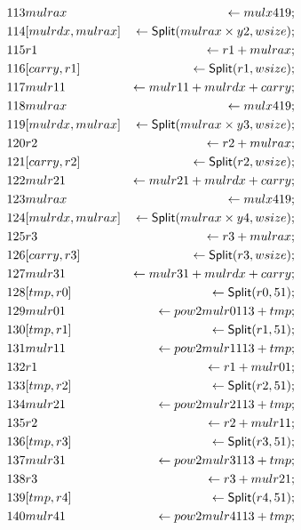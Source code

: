 \begin{align*}
113 & mulrax & \leftarrow mulx419; \\
114 & \concat{mulrdx}{mulrax} & \leftarrow \dslcode{Split}(mulrax \times y2, wsize); \\
115 & r1 & \leftarrow r1 + mulrax; \\
116 & \concat{carry}{r1} & \leftarrow \dslcode{Split}(r1, wsize); \\
117 & mulr11 & \leftarrow mulr11 + mulrdx + carry; \\
118 & mulrax & \leftarrow mulx419; \\
119 & \concat{mulrdx}{mulrax} & \leftarrow \dslcode{Split}(mulrax \times y3, wsize); \\
120 & r2 & \leftarrow r2 + mulrax; \\
121 & \concat{carry}{r2} & \leftarrow \dslcode{Split}(r2, wsize); \\
122 & mulr21 & \leftarrow mulr21 + mulrdx + carry; \\
123 & mulrax & \leftarrow mulx419; \\
124 & \concat{mulrdx}{mulrax} & \leftarrow \dslcode{Split}(mulrax \times y4, wsize); \\
125 & r3 & \leftarrow r3 + mulrax; \\
126 & \concat{carry}{r3} & \leftarrow \dslcode{Split}(r3, wsize); \\
127 & mulr31 & \leftarrow mulr31 + mulrdx + carry; \\
128 & \concat{tmp}{r0} & \leftarrow \dslcode{Split}(r0, 51); \\
129 & mulr01 & \leftarrow pow2 mulr01 13 + tmp; \\
130 & \concat{tmp}{r1} & \leftarrow \dslcode{Split}(r1, 51); \\
131 & mulr11 & \leftarrow pow2 mulr11 13 + tmp; \\
132 & r1 & \leftarrow r1 + mulr01; \\
133 & \concat{tmp}{r2} & \leftarrow \dslcode{Split}(r2, 51); \\
134 & mulr21 & \leftarrow pow2 mulr21 13 + tmp; \\
135 & r2 & \leftarrow r2 + mulr11; \\
136 & \concat{tmp}{r3} & \leftarrow \dslcode{Split}(r3, 51); \\
137 & mulr31 & \leftarrow pow2 mulr31 13 + tmp; \\
138 & r3 & \leftarrow r3 + mulr21; \\
139 & \concat{tmp}{r4} & \leftarrow \dslcode{Split}(r4, 51); \\
140 & mulr41 & \leftarrow pow2 mulr41 13 + tmp; \\

\end{align*}
